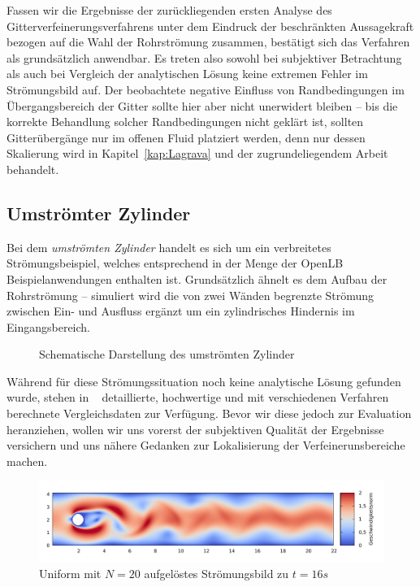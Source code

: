 \bigskip

Fassen wir die Ergebnisse der zurückliegenden ersten Analyse des Gitterverfeinerungsverfahrens unter dem Eindruck der beschränkten Aussagekraft bezogen auf die Wahl der Rohrströmung zusammen, bestätigt sich das Verfahren als grundsätzlich anwendbar. Es treten also sowohl bei subjektiver Betrachtung als auch bei Vergleich der analytischen Lösung keine extremen Fehler im Strömungsbild auf. Der beobachtete negative Einfluss von Randbedingungen im Übergangsbereich der Gitter sollte hier aber nicht unerwidert bleiben -- bis die korrekte Behandlung solcher Randbedingungen nicht geklärt ist, sollten Gitterübergänge nur im offenen Fluid platziert werden, denn nur dessen Skalierung wird in Kapitel~\ref{kap:Lagrava} und der zugrundeliegendem Arbeit \cite{Lagrava12} behandelt.

\newpage
\subsection{Umströmter Zylinder}

Bei dem \emph{umströmten Zylinder} handelt es sich um ein verbreitetes Strömungsbeispiel, welches entsprechend in der Menge der OpenLB Beispielanwendungen enthalten ist. Grundsätzlich ähnelt es dem Aufbau der Rohrströmung -- simuliert wird die von zwei Wänden begrenzte Strömung zwischen Ein- und Ausfluss ergänzt um ein zylindrisches Hindernis im Eingangsbereich.

\begin{figure}[h]
\centering

\caption{Schematische Darstellung des umströmten Zylinder \cite[vgl.~Abb.~1]{SchaeferTurek96}}
\label{fig:cylinder2d_overview}
\end{figure}

Während für diese Strömungssituation noch keine analytische Lösung gefunden wurde, stehen in ~\cite{SchaeferTurek96} detaillierte, hochwertige und mit verschiedenen Verfahren berechnete Vergleichsdaten zur Verfügung. Bevor wir diese jedoch zur Evaluation heranziehen, wollen wir uns vorerst der subjektiven Qualität der Ergebnisse versichern und uns nähere Gedanken zur Lokalisierung der Verfeinerunsbereiche machen.

\begin{figure}[H]
\begin{adjustbox}{center}
\includegraphics[width=1.2\textwidth]{img/static/cylinder2d_unrefined_n20_re100_16s.pdf}
\end{adjustbox}
\caption{Uniform mit \(N=20\) aufgelöstes Strömungsbild zu \(t=16s\)}
\label{fig:UniformCylinderVelocity16s}
\end{figure}

